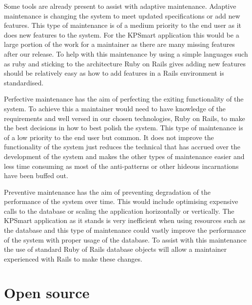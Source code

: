 \documentclass{style/CRPITStyle}
\begin{document}
\vspace{.1in}

Some tools are already present to assist with adaptive maintenance. Adaptive
maintenance is changing the system to meet updated specifications or add new
features. This type of maintenance is of a medium priority to the end user as it
does new features to the system.
For the KPSmart application this would be a large portion of the work
for a maintainer as there are many missing features after our release. To help
with this maintenance by using a simple languages such as ruby and sticking to
the architecture Ruby on Rails gives adding new features should be relatively
easy as how to add features in a Rails environment is standardised. 

\vspace{.1in}

Perfective maintenance has the aim of perfecting the exiting functionality of
the system. To achieve this a maintainer would need to have knowledge of the
requirements and well versed in our chosen technologies, Ruby on Rails, to make
the best decisions in how to best polish the system. This type of maintenance is
of a low priority to the end user but common. It does not improve the functionality
of the system just reduces the technical that has accrued over the development
of the system and makes the other types of maintenance easier and less time
consuming as most of the anti-patterns or other hideous incarnations have been
buffed out.

\vspace{.1in}

Preventive maintenance has the aim of preventing degradation of the performance
of the system over time. This would include optimising expensive calls to the
database or scaling the application horizontally or vertically. The KPSmart
application as it stands is very inefficient when using resources such as the database
and this type of maintenance could vastly improve the performance of the system
with proper usage of the database. To assist with this maintenance the
use of standard Ruby of Rails database objects will allow a maintainer
experienced with Rails to make these changes.

\section{Open source}
% 
\end{document}
